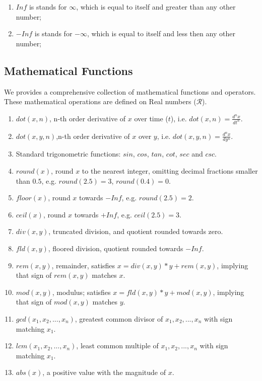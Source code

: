 \documentclass{WileySix}
\begin{document}
\begin{enumerate}
\item $Inf$ is stands for $\infty$, which is equal to itself and greater than any other number;
\item $-Inf$ is stands for $-\infty$, which is equal to itself and less then any other number;
\end{enumerate}



\subsection{Mathematical Functions}
We provides a comprehensive collection of mathematical functions and operators. These mathematical operations are defined on Real numbers ($\mathcal{R}$).

\begin{enumerate}
\item $dot(x,n)$, n-th order derivative of $x$ over time ($t$), i.e. $dot(x,n)=\frac{d^n x}{dt^n}$.
\item $dot(x,y,n)$,n-th order derivative of $x$ over $y$, i.e. $dot(x,y,n)=\frac{d^n x}{d y^n}$.
\item Standard trigonometric functions: $sin$,    $cos$,    $tan$,    $cot$,    $sec$ and    $csc$.
\item $round(x)$, round $x$ to the nearest integer, omitting decimal fractions smaller than $0.5$, e.g. $round(2.5)=3$, $round(0.4)=0$.
\item $floor(x)$, round $x$ towards $-Inf$, e.g. $round(2.5)=2$.
\item $ceil(x)$, round $x$ towards $+Inf$, e.g. $ceil(2.5)=3$.
\item $div(x,y)$, truncated division, and quotient rounded towards zero.
\item $fld(x,y)$, floored division, quotient rounded towards $-Inf$.
\item $rem(x,y)$, remainder, satisfies $x = div(x,y)*y + rem(x,y)$, implying that sign of $rem(x,y)$ matches $x$.
\item $mod(x,y)$, modulus; satisfies $x = fld(x,y)*y + mod(x,y)$, implying that sign of $ mod(x,y)$ matches $y$.
\item $gcd(x_1,x_2,...,x_n)$, greatest common divisor of $x_1, x_2, ..., x_n$ with sign matching $x_1$.
\item $lcm(x_1,x_2,...,x_n)$, least common multiple of $x_1, x_2, ..., x_n$ with sign matching $x_1$.
\item $abs(x)$, a positive value with the magnitude of $x$.

\end{enumerate}
\end{document}

